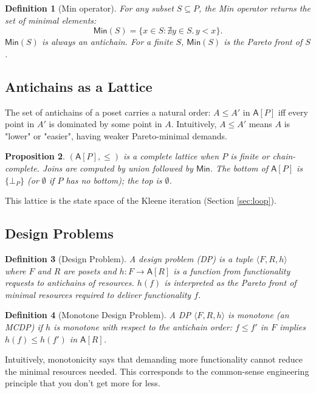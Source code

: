 \documentclass[11pt,a4paper]{article}
\newtheorem{definition}{Definition}[section]
\newtheorem{proposition}[definition]{Proposition}
\newcommand{\Min}{\mathsf{Min}}
\newcommand{\Antichain}{\mathsf{A}}
\begin{document}
\begin{definition}[Min operator]
For any subset $S \subseteq P$, the \emph{Min operator} returns the
set of minimal elements:
\[
\Min(S) = \{ x \in S : \nexists y \in S.\, y < x \}.
\]
$\Min(S)$ is always an antichain. For a finite $S$, $\Min(S)$ is the
Pareto front of $S$.
\end{definition}

\subsection{Antichains as a Lattice}

The set of antichains of a poset carries a natural order: $A \leq A'$
in $\Antichain[P]$ iff every point in $A'$ is dominated by some point
in $A$. Intuitively, $A \leq A'$ means $A$ is "lower" or "easier",
having weaker Pareto-minimal demands.

\begin{proposition}
$(\Antichain[P], \leq)$ is a complete lattice when $P$ is finite or
chain-complete. Joins are computed by union followed by $\Min$. The
bottom of $\Antichain[P]$ is $\{\bot_P\}$ (or $\emptyset$ if $P$ has
no bottom); the top is $\emptyset$.
\end{proposition}

This lattice is the state space of the Kleene iteration (Section
\ref{sec:loop}).

\subsection{Design Problems}

\begin{definition}[Design Problem]
A \emph{design problem (DP)} is a tuple $\langle F, R, h \rangle$
where $F$ and $R$ are posets and $h : F \to \Antichain[R]$ is a
function from functionality requests to antichains of resources.
$h(f)$ is interpreted as the Pareto front of minimal resources
required to deliver functionality $f$.
\end{definition}

\begin{definition}[Monotone Design Problem]
A DP $\langle F, R, h \rangle$ is \emph{monotone} (an MCDP) if $h$
is monotone with respect to the antichain order: $f \leq f'$ in $F$
implies $h(f) \leq h(f')$ in $\Antichain[R]$.
\end{definition}

Intuitively, monotonicity says that demanding more functionality
cannot reduce the minimal resources needed. This corresponds to the
common-sense engineering principle that you don't get more for less.
\end{document}
